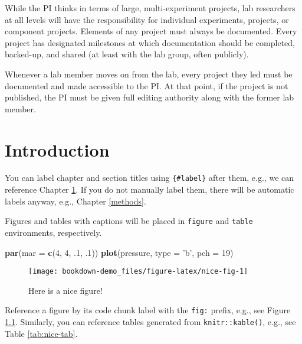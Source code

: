 \documentclass[
]{book}
\newenvironment{Shaded}{\begin{snugshade}}{\end{snugshade}}
\newcommand{\DataTypeTok}[1]{\textcolor[rgb]{0.13,0.29,0.53}{#1}}
\newcommand{\DecValTok}[1]{\textcolor[rgb]{0.00,0.00,0.81}{#1}}
\newcommand{\FloatTok}[1]{\textcolor[rgb]{0.00,0.00,0.81}{#1}}
\newcommand{\KeywordTok}[1]{\textcolor[rgb]{0.13,0.29,0.53}{\textbf{#1}}}
\newcommand{\NormalTok}[1]{#1}
\newcommand{\StringTok}[1]{\textcolor[rgb]{0.31,0.60,0.02}{#1}}
\begin{document}
While the PI thinks in terms of large, multi-experiment projects, lab researchers at all levels will have the responsibility for individual experiments, projects, or component projects. Elements of any project must always be documented. Every project has designated milestones at which documentation should be completed, backed-up, and shared (at least with the lab group, often publicly).

Whenever a lab member moves on from the lab, every project they led must be documented and made accessible to the PI. At that point, if the project is not published, the PI must be given full editing authority along with the former lab member.

\hypertarget{intro}{%
\chapter{Introduction}\label{intro}}

You can label chapter and section titles using \texttt{\{\#label\}} after them, e.g., we can reference Chapter \ref{intro}. If you do not manually label them, there will be automatic labels anyway, e.g., Chapter \ref{methods}.

Figures and tables with captions will be placed in \texttt{figure} and \texttt{table} environments, respectively.

\begin{Shaded}
\begin{Highlighting}[]
\KeywordTok{par}\NormalTok{(}\DataTypeTok{mar =} \KeywordTok{c}\NormalTok{(}\DecValTok{4}\NormalTok{, }\DecValTok{4}\NormalTok{, }\FloatTok{.1}\NormalTok{, }\FloatTok{.1}\NormalTok{))}
\KeywordTok{plot}\NormalTok{(pressure, }\DataTypeTok{type =} \StringTok{'b'}\NormalTok{, }\DataTypeTok{pch =} \DecValTok{19}\NormalTok{)}
\end{Highlighting}
\end{Shaded}

\begin{figure}

{\centering \texttt{[image: bookdown-demo\_files/figure-latex/nice-fig-1]} 

}

\caption{Here is a nice figure!}\label{fig:nice-fig}
\end{figure}

Reference a figure by its code chunk label with the \texttt{fig:} prefix, e.g., see Figure \ref{fig:nice-fig}. Similarly, you can reference tables generated from \texttt{knitr::kable()}, e.g., see Table \ref{tab:nice-tab}.
\end{document}
